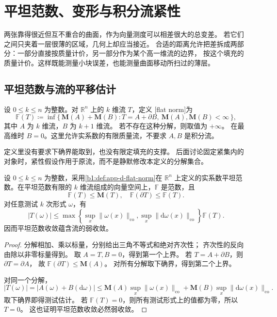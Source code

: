\section{平坦范数、变形与积分流紧性}
\label{b1:sec:D105}

两张靠得很近但互不重合的曲面，作为向量测度可以相差很大的总变差。
若它们之间只夹着一层很薄的区域，几何上却应当接近。
合适的距离允许把差拆成两部分：一部分直接按质量计价，另一部分作为某个高一维流的边界，
按这个填充的质量计价。这样既能测量小块误差，也能测量曲面移动所扫过的薄层。

\subsection{平坦范数与流的平移估计}
\label{b1:subsec:D10501}

\begin{definition}\label{b1:def:app-d-flat-norm}
设 \(0\le k\le n\) 为整数。对 \(\mathbb R^n\) 上的 \(k\) 维流 \(T\)，定义%
[flat norm]为
\[
 \mathbb F(T)\coloneqq\inf\{\,\mathbf M(A)+\mathbf M(B):
       T=A+\partial B,\ \mathbf M(A),\mathbf M(B)<\infty\,\},
\]
其中 \(A\) 为 \(k\) 维流，\(B\) 为 \(k+1\) 维流。
若不存在这种分解，则取值为 \(+\infty\)。
在最高维时 \(B=0\)。这里允许实系数的有限质量流，不要求 \(A,B\) 是积分流。
\end{definition}

定义里没有要求下确界能取到，也没有限定填充的支撑。
后面讨论固定紧集内的对象时，紧性假设作用于原流，而不是静默修改本定义的分解集合。

\begin{proposition}\label{b1:prop:app-d-flat-properties}
设 \(0\le k\le n\) 为整数，采用\cref{b1:def:app-d-flat-norm}在 \(\mathbb R^n\) 上定义的实系数平坦范数。在平坦范数有限的 \(k\) 维流组成的向量空间上，\(\mathbb F\) 是范数，且
\[
 \mathbb F(T)\leq\mathbf M(T),\quad
 \mathbb F(\partial T)\leq\mathbb F(T).
\]
对任意测试 \(k\) 次形式 \(\omega\)，有
\[
 |T(\omega)|
 \leq
 \max\!\left\{\sup_x\|\omega(x)\|_{\mathrm{co}},
               \sup_x\|\mathrm{d}\omega(x)\|_{\mathrm{co}}\right\}\mathbb F(T).
\]
因而平坦范数收敛蕴含流的弱收敛。
\end{proposition}
\begin{proof}
分解相加、乘以标量，分别给出三角不等式和绝对齐次性；
齐次性的反向由除以非零标量得到。
取 \(A=T,B=0\)，得到第一个上界。
若 \(T=A+\partial B\)，则 \(\partial T=\partial A\)，
故 \(\mathbb F(\partial T)\leq\mathbf M(A)\)。
对所有分解取下确界，得到第二个上界。

对同一个分解，
\[
 |T(\omega)|=|A(\omega)+B(\mathrm{d}\omega)|
 \leq \mathbf M(A)\sup_x\|\omega(x)\|_{\mathrm{co}}
       +\mathbf M(B)\sup_x\|\mathrm{d}\omega(x)\|_{\mathrm{co}}.
\]
取下确界即得测试估计。
若 \(\mathbb F(T)=0\)，则所有测试形式上的值都为零，所以 \(T=0\)。
这也证明平坦范数收敛必然弱收敛。
\end{proof}


